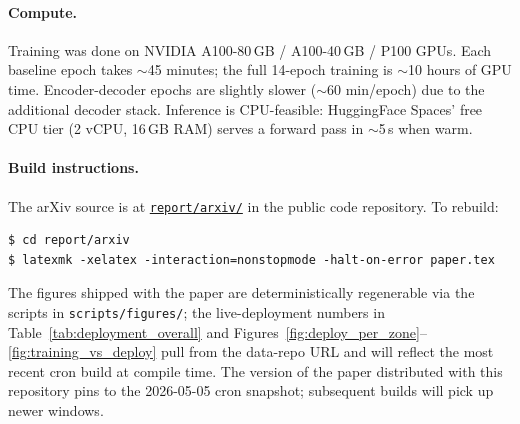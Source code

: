 \paragraph{Compute.}
Training was done on NVIDIA A100-80\,GB / A100-40\,GB / P100 GPUs. Each baseline epoch takes $\sim$45 minutes; the full 14-epoch training is $\sim$10 hours of GPU time. Encoder-decoder epochs are slightly slower ($\sim$60 min/epoch) due to the additional decoder stack. Inference is CPU-feasible: HuggingFace Spaces' free CPU tier (2 vCPU, 16\,GB RAM) serves a forward pass in $\sim$5\,s when warm.

\paragraph{Build instructions.}
The arXiv source is at \href{https://github.com/jeffliulab/real-time-power-predict/tree/main/report/arxiv}{\texttt{report/arxiv/}} in the public code repository. To rebuild:
\begin{lstlisting}[basicstyle=\ttfamily\footnotesize]
$ cd report/arxiv
$ latexmk -xelatex -interaction=nonstopmode -halt-on-error paper.tex
\end{lstlisting}

The figures shipped with the paper are deterministically regenerable via the scripts in \texttt{scripts/figures/}; the live-deployment numbers in Table~\ref{tab:deployment_overall} and Figures~\ref{fig:deploy_per_zone}--\ref{fig:training_vs_deploy} pull from the data-repo URL and will reflect the most recent cron build at compile time. The version of the paper distributed with this repository pins to the 2026-05-05 cron snapshot; subsequent builds will pick up newer windows.
